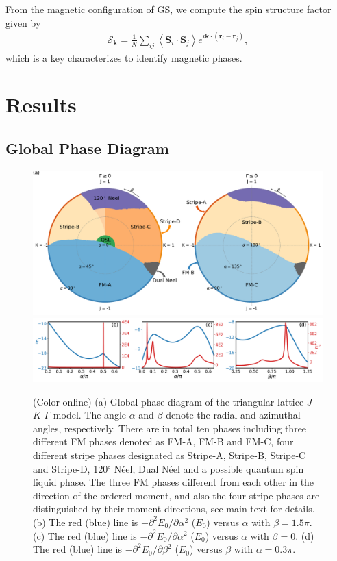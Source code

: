 \documentclass[aps,prb,reprint,amsfonts,amsmath,amssymb,showpacs,groupedaddress,superscriptaddress]{revtex4-1}
\begin{document}
From the magnetic configuration of GS, we compute the spin structure factor given by
\begin{align}
    \mathcal{S}_{\bm{k}} = \frac{1}{N} \sum_{ij} \left \langle \bm{S}_i \cdot \bm{S}_j \right \rangle e^{i \bm{k} \cdot (\bm{r}_i-\bm{r}_j)},
\end{align}
which is a key characterizes to identify magnetic phases.

\section{\label{sec:Results}Results}

\subsection{\label{subsec:GlobalPhaseDiagram}Global Phase Diagram}

\begin{figure}
    \centering
    \includegraphics[width=\textwidth]{fig/QuantumGlobalPhaseDiagram.pdf}
    \includegraphics[width=\linewidth]{fig/SecondDerivatives.pdf}
    \caption{\label{fig:QuantumPhaseDiagram}(Color online) (a) Global phase diagram of the triangular lattice $J$-$K$-$\Gamma$ model. The angle $\alpha$ and $\beta$ denote the radial and azimuthal angles, respectively. There are in total ten phases including three different FM phases denoted as FM-A, FM-B and FM-C, four different stripe phases designated as Stripe-A, Stripe-B, Stripe-C and Stripe-D, 120$^\circ$ N\'{e}el, Dual N\'{e}el and a possible quantum spin liquid phase. The three FM phases different from each other in the direction of the ordered moment, and also the four stripe phases are distinguished by their moment directions, see main text for details. (b) The red (blue) line is $-\partial^2E_0/\partial\alpha^2$ ($E_0$) versus $\alpha$ with $\beta=1.5\pi$. (c) The red (blue) line is $-\partial^2E_0/\partial\alpha^2$ ($E_0$) versus $\alpha$ with $\beta=0$. (d) The red (blue) line is $-\partial^2E_0/\partial\beta^2$ ($E_0$) versus $\beta$ with $\alpha=0.3\pi$.}
\end{figure}
\end{document}
